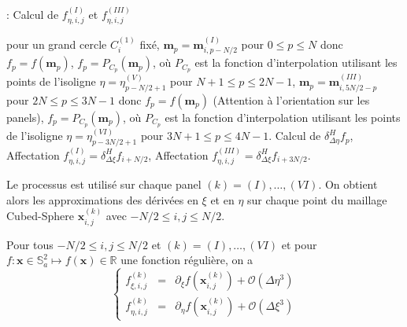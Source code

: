 \begin{center}
\begin{minipage}[H]{12cm}
  \begin{algorithm}[H]
    \caption{: Calcul de $f_{\eta, i, j}^{(I)}$ et $f_{\eta, i, j}^{(III)}$}\label{alg:deltaeta}
    \begin{algorithmic}[1]
    \State pour un grand cercle $C_i^{(1)}$ fixé,
             \State  $\mathbf{m}_p = \mathbf{m}_{i,p-N/2}^{(I)}$ pour $0  \leq p \leq N$ donc $f_p = f(\mathbf{m}_p)$,
             \State $f_p = P_{C_p}(\mathbf{m}_p)$, où $P_{C_p}$ est la fonction d'interpolation utilisant les points de l'isoligne $\eta = \eta^{(V)}_{p-N/2+1}$ pour $N+1 \leq p \leq 2N-1$,
             \State  $\mathbf{m}_p = \mathbf{m}_{i,5N/2-p}^{(III)}$ pour $2N  \leq p \leq 3N-1$ donc $f_p = f(\mathbf{m}_p)$ (Attention à l'orientation sur les panels),
             \State $f_p = P_{C_p}(\mathbf{m}_p)$, où $P_{C_p}$ est la fonction d'interpolation utilisant les points de l'isoligne $\eta = \eta^{(VI)}_{p-3N/2+1}$ pour $3N+1 \leq p \leq 4N-1$.
            \EndFor
    \State Calcul de $\delta_{\Delta \eta}^H f_p$,
    \State Affectation $f_{\eta,i,j}^{(I)} = \delta_{\Delta \xi}^H f_{i+N/2}$,
    \State Affectation $f_{\eta,i,j}^{(III)} = \delta_{\Delta \xi}^H f_{i+3N/2}$.
    \EndFor
    \end{algorithmic}
    \end{algorithm}
\end{minipage}
\end{center}
Le processus est utilisé sur chaque panel $(k) = (I), \ldots , (VI)$. On obtient alors les approximations des dérivées en $\xi$ et en $\eta$ sur chaque point du maillage Cubed-Sphere $\mathbf{x}_{i,j}^{(k)}$ avec $-N/2 \leq i,j \leq N/2$.

\begin{theoreme}
Pour tous $-N/2 \leq i,j \leq N/2$ et $(k) = (I) , \ldots , (VI)$ et pour $f : \mathbf{x} \in \mathbb{S}_a^2 \mapsto f(\mathbf{x}) \in \mathbb{R}$ une fonction régulière, on a 
\begin{equation}
\left\lbrace
\begin{array}{rcl}
f_{\xi,i,j}^{(k)} & = & \partial_{\xi} f(\mathbf{x}_{i,j}^{(k)}) + \mathcal{O}(\Delta \eta^3) \\
f_{\eta,i,j}^{(k)} & = & \partial_{\eta} f(\mathbf{x}_{i,j}^{(k)}) + \mathcal{O}(\Delta \xi^3)
\end{array}
\right.
\end{equation}
\label{th:consistance_der_xieta}
\end{theoreme}

